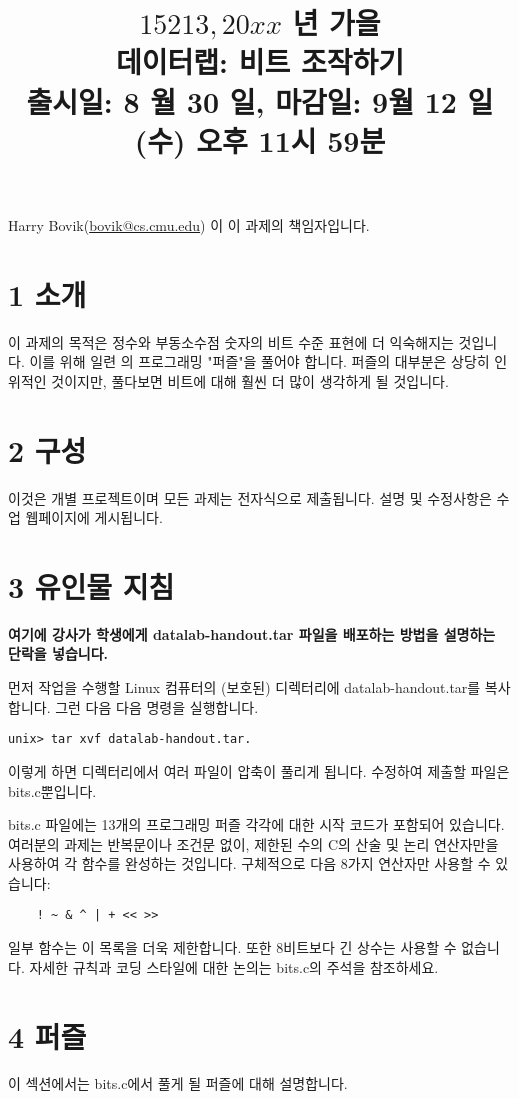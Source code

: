\documentclass{article}
\title{$15213,20 x x$ 년 가을 \\
 데이터랩: 비트 조작하기 \\
 출시일: 8 월 30 일, 마감일: 9월 12 일(수) 오후 11시 59분}
\author{}
\date{}
\begin{document}
\maketitle

\noindent
Harry Bovik(\href{mailto:bovik@cs.cmu.edu}{bovik@cs.cmu.edu}) 이 이 과제의 책임자입니다.

\section*{1 소개}
이 과제의 목적은 정수와 부동소수점 숫자의 비트 수준 표현에 더 익숙해지는 것입니다. 이를 위해 일련 의 프로그래밍 "퍼즐"을 풀어야 합니다. 퍼즐의 대부분은 상당히 인위적인 것이지만, 풀다보면 비트에 대해 훨씬 더 많이 생각하게 될 것입니다.

\section*{2 구성}
이것은 개별 프로젝트이며 모든 과제는 전자식으로 제출됩니다. 설명 및 수정사항은 수업 웹페이지에 게시됩니다.

\section*{3 유인물 지침}
\textbf{여기에 강사가 학생에게 datalab-handout.tar 파일을 배포하는 방법을 설명하는 단락을 넣습니다.}

\noindent
먼저 작업을 수행할 Linux 컴퓨터의 (보호된) 디렉터리에 datalab-handout.tar를 복사합니다. 그런 다음 다음 명령을 실행합니다.
\begin{verbatim}
unix> tar xvf datalab-handout.tar.
\end{verbatim}

\noindent
이렇게 하면 디렉터리에서 여러 파일이 압축이 풀리게 됩니다. 수정하여 제출할 파일은 bits.c뿐입니다.

\noindent
bits.c 파일에는 13개의 프로그래밍 퍼즐 각각에 대한 시작 코드가 포함되어 있습니다. 여러분의 과제는 반복문이나 조건문 없이, 제한된 수의 C의 산술 및 논리 연산자만을 사용하여 각 함수를 완성하는 것입니다. 구체적으로 다음 8가지 연산자만 사용할 수 있습니다: 
\begin{verbatim}
    ! ~ & ^ | + << >>
\end{verbatim}

\noindent
일부 함수는 이 목록을 더욱 제한합니다. 또한 8비트보다 긴 상수는 사용할 수 없습니다. 자세한 규칙과 코딩 스타일에 대한 논의는 bits.c의 주석을 참조하세요.


\section*{4 퍼즐}
이 섹션에서는 bits.c에서 풀게 될 퍼즐에 대해 설명합니다.
\end{document}
